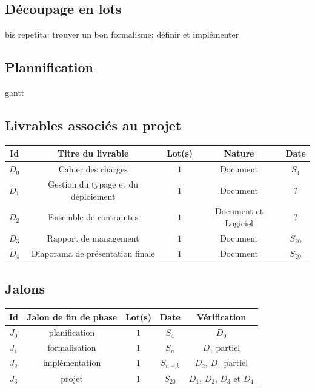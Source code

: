 \documentclass[a4paper]{article}
\begin{document}
\subsection{Découpage en lots}
bis repetita: trouver un bon formalisme; définir et implémenter
\subsection{Plannification}
gantt
\subsection{Livrables associés au projet}
\begin{table}
\centering
\begin{tabular}{c|c|c|c|c}
	Id & Titre du livrable & Lot(s) & Nature & Date \\
	\hline
	\hline
	$D_0$ & Cahier des charges & $1$ & Document & $S_4$ \\
	\hline
	$D_1$ & Gestion du typage et du déploiement & $1$ & Document & $?$ \\
	\hline
	$D_2$ & Ensemble de contraintes & $1$ & Document et Logiciel & $?$ \\
	\hline
	$D_3$ & Rapport de management & $1$ & Document & $S_{20}$ \\
	\hline
	$D_4$ & Diaporama de présentation finale & $1$ & Document & $S_{20}$ \\
\end{tabular}
\end{table}

\subsection{Jalons}
\begin{table}
\centering
\begin{tabular}{c|c|c|c|c}
	Id & Jalon de fin de phase & Lot(s) & Date & Vérification \\
	\hline
	\hline
	$J_0$ & planification & $1$ & $S_4$ & $D_0$ \\
	\hline
	$J_1$ & formalisation & $1$ & $S_n$ & $D_1$ partiel \\
	\hline
	$J_2$ & implémentation & $1$ & $S_{n+k}$ & $D_2$, $D_1$ partiel \\
	\hline
	$J_3$ & projet & $1$ & $S_{20}$ & $D_1$, $D_2$, $D_3$ et $D_4$ \\
\end{tabular}
\end{table}
\end{document}
